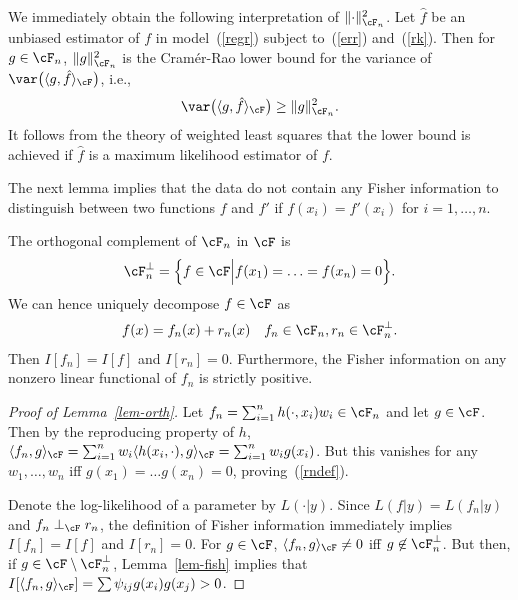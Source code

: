 \documentclass[preprint,12pt,authoryear]{elsarticle}
\DeclarePairedDelimiter{\norm}{\lVert}{\rVert}
\begin{document}
We immediately obtain the following interpretation of $\norm{\cdot}_{\cF_n}^2$. Let $\hat f$ be an unbiased estimator of $f$ in model~(\ref{regr}) subject to~(\ref{err}) and~(\ref{rk}). Then for $g\in\cF_n$, $\norm{g}_{\cF_n}^2$ is the Cram\'er-Rao lower bound for the variance of $\var\big(\langle g,\hat f\rangle_\cF\big)$, i.e.,
\begin{align}\label{cr}
   \var\big(\langle g,\hat f\rangle_\cF\big) \ge \norm{g}_{\cF_n}^2. 
\end{align}
It follows from the theory of weighted least squares that the lower bound is achieved if $\hat f$ is a maximum likelihood estimator of $f$. 




The next lemma implies that the data do not contain any Fisher information to distinguish between two functions $f$ and $f'$ if $f(x_i)=f'(x_i)$ for $i=1,\ldots,n$.  
\begin{lemma}\label{lem-orth}
	The orthogonal complement of $\cF_n$ in $\cF$ is 	
	\begin{eqnarray}\label{rndef}
	\cF_n^\perp = \Big\{ f\in\cF \Big| f(x_1) = \ldots = f(x_n) = 0 \Big\}.
	\end{eqnarray}
	We can hence uniquely decompose $f\in\cF$ as
	\begin{eqnarray}\label{fnip1}
	f(x) = f_n(x) + r_n(x) \quad f_n\in\cF_n,r_n\in\cF_n^\perp.
	\end{eqnarray}
	Then $I[f_n]=I[f]$ and $I[r_n]=0$. Furthermore, the Fisher information on any nonzero linear functional of $f_n$ is strictly positive.
\end{lemma}
\begin{proof}[Proof of Lemma~\ref{lem-orth}]
	Let $f_n=\sum_{i=1}^n h(\cdot,x_i)w_i\in\cF_n$ and let $g\in\cF$.
	Then by the reproducing property of $h$, $\langle f_n,g\rangle_\cF=\sum_{i=1}^n w_i\langle h(x_i,\cdot),g\rangle_\cF=\sum_{i=1}^n w_ig(x_i)$. But this vanishes for any $w_1,\ldots,w_n$ iff $g(x_1)=\ldots g(x_n)=0$, proving~(\ref{rndef}).
	
	
	Denote the log-likelihood of a parameter by $L(\cdot|y)$. Since $L(f|y)=L(f_n|y)$ and $f_n\perp_\cF r_n$, the definition of Fisher information immediately implies $I[f_n]=I[f]$ and $I[r_n]=0$.
	For $g\in\cF$, $\langle f_n,g\rangle_\cF\ne 0$ iff $g\not\in\cF_n^\perp$. But then, if $g\in\cF\setminus\cF_n^\perp$, Lemma~\ref{lem-fish}  implies that  $I[\langle f_n,g\rangle_\cF]=\sum\psi_{ij}g(x_i)g(x_j)>0$. 
\end{proof}
\end{document}
